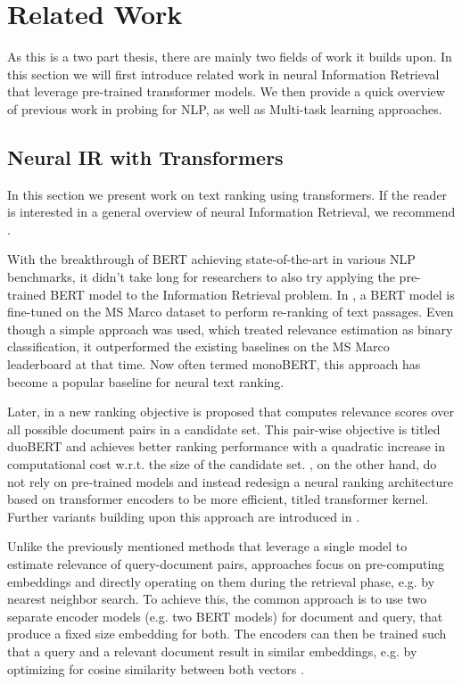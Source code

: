 \chapter{Related Work}
\label{chap:prev}
As this is a two part thesis, there are mainly two fields of work it builds upon. In this section we will first introduce related work in neural Information Retrieval that leverage pre-trained transformer models. We then provide a quick overview of previous work in probing for NLP, as well as Multi-task learning approaches.

\section{Neural IR with Transformers}
In this section we present work on text ranking using transformers. If the reader is interested in a general overview of neural Information Retrieval, we recommend \citep{mitra2018an, Onal2017NeuralIR, Guo2020ADL}.

With the breakthrough of BERT \citep{devlin-etal-2019-bert} achieving state-of-the-art in various NLP benchmarks, it didn't take long for researchers to also try applying the pre-trained BERT model to the Information Retrieval problem. In \citep{Nogueira2019PassageRW}, a BERT model is fine-tuned on the MS Marco dataset \citep{DBLP:journals/corr/NguyenRSGTMD16} to perform re-ranking of text passages. Even though a simple approach was used, which treated relevance estimation as binary classification, it outperformed the existing baselines on the MS Marco leaderboard at that time. Now often termed monoBERT, this approach has become a popular baseline for neural text ranking.

Later, in \citep{Nogueira2019MultiStageDR} a new ranking objective is proposed that computes relevance scores over all possible document pairs in a candidate set. This pair-wise objective is titled duoBERT and achieves better ranking performance with a quadratic increase in computational cost w.r.t. the size of the candidate set. \citep{DBLP:journals/corr/abs-1912-01385}, on the other hand, do not rely on pre-trained models and instead redesign a neural ranking architecture based on transformer encoders to be more efficient, titled transformer kernel. Further variants building upon this approach are introduced in \citep{Hofsttter2020LocalSO, 10.1145/3404835.3463049}.

Unlike the previously mentioned methods that leverage a single model to estimate relevance of query-document pairs,  approaches focus on pre-computing embeddings and directly operating on them during the retrieval phase, e.g. by nearest neighbor search. To achieve this, the common approach is to use two separate encoder models (e.g. two BERT models) for document and query, that produce a fixed size embedding for both. The encoders can then be trained such that a query and a relevant document result in similar embeddings, e.g. by optimizing for cosine similarity between both vectors \citep{Humeau2020Poly-encoders, 10.1145/3397271.3401075, DBLP:journals/corr/abs-1908-10084}.


